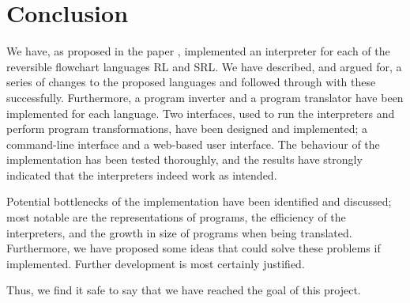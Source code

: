 \chapter*{Conclusion}
 

We have, as proposed in the paper \cite{REV}, implemented an interpreter for each of the reversible flowchart languages RL and SRL. We have described, and argued for, a series of changes to the proposed languages and followed through with these successfully. Furthermore, a program inverter and a program translator have been implemented for each language. Two interfaces, used to run the interpreters and perform program transformations, have been designed and implemented; a command-line interface and a web-based user interface. The behaviour of the implementation has been tested thoroughly, and the results have strongly indicated that the interpreters indeed work as intended.

Potential bottlenecks of the implementation have been identified and discussed; most notable are the representations of programs, the efficiency of the interpreters, and the growth in size of programs when being translated. Furthermore, we have proposed some ideas that could solve these problems if implemented. Further development is most certainly justified.


Thus, we find it safe to say that we have reached the goal of this project. %
